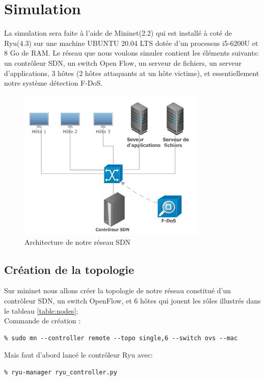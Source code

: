 \section{Simulation}
La simulation sera faite à l'aide de Mininet(2.2) qui est installé à coté de Ryu(4.3) sur une machine UBUNTU 20.04 LTS dotée d'un processus i5-6200U et 8 Go de RAM. Le réseau que nous voulons simuler contient les éléments suivants: un contrôleur SDN, un switch Open Flow, un serveur de fichiers, un serveur d'applications, 3 hôtes (2 hôtes attaquants at un hôte victime), et essentiellement notre système détection F-DoS.
\begin{figure}[h]
\centering
\includegraphics[width=0.8\textwidth]{Figures/simulation}
\decoRule
\caption{Architecture de notre réseau SDN}
\label{fig:architecture}
\end{figure} 

\subsection{Création de la topologie}
Sur mininet nous allons créer la topologie de notre réseau constitué d'un contrôleur SDN, un switch OpenFlow, et 6 hôtes qui jouent les rôles illustrés dans le tableau \ref{table:nodes};\\

\noindent Commande de création :
\begin{verbatim}
% sudo mn --controller remote --topo single,6 --switch ovs --mac
\end{verbatim}
Mais faut d'abord lancé le contrôleur Ryu avec:
\begin{verbatim}
% ryu-manager ryu_controller.py 
\end{verbatim}

